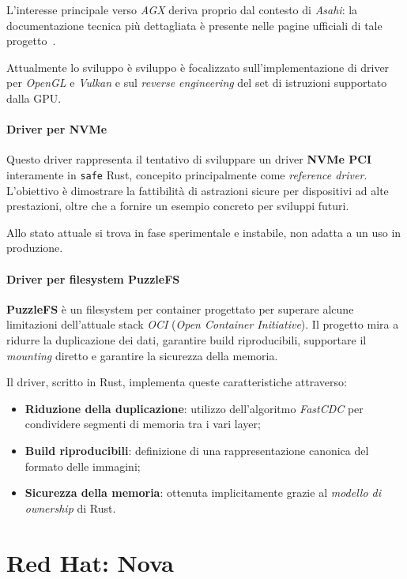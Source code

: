 L'interesse principale verso \textit{AGX} deriva proprio dal contesto di \textit{Asahi}: la documentazione tecnica più dettagliata è presente
nelle pagine ufficiali di tale progetto~\cite{asahi}.

Attualmente lo sviluppo è sviluppo è focalizzato sull'implementazione di driver per \textit{OpenGL} e \textit{Vulkan} e sul \textit{reverse engineering} del set di istruzioni 
supportato dalla GPU.\ 

\paragraph{Driver per NVMe}
Questo driver rappresenta il tentativo di sviluppare un driver \textbf{NVMe PCI} interamente in \texttt{safe} Rust, concepito principalmente come \textit{reference driver}.
L'obiettivo è dimostrare la fattibilità di astrazioni sicure per dispositivi ad alte prestazioni, oltre che a fornire un esempio concreto per sviluppi futuri.

Allo stato attuale si trova in fase sperimentale e instabile, non adatta a un uso in produzione.

\paragraph{Driver per filesystem PuzzleFS}
\textbf{PuzzleFS} è un filesystem per container progettato per superare alcune limitazioni dell'attuale stack \textit{OCI} (\textit{Open Container Initiative}).
Il progetto mira a ridurre la duplicazione dei dati, garantire build riproducibili, supportare il \textit{mounting} diretto e garantire la sicurezza della memoria.

Il driver, scritto in Rust, implementa queste caratteristiche attraverso:
\begin{itemize}
    \item \textbf{Riduzione della duplicazione}: utilizzo dell'algoritmo \textit{FastCDC} per condividere segmenti di memoria tra i vari layer;
    \item \textbf{Build riproducibili}: definizione di una rappresentazione canonica del formato delle immagini;
    \item \textbf{Sicurezza della memoria}: ottenuta implicitamente grazie al \textit{modello di ownership} di Rust.
\end{itemize}

\section{Red Hat: Nova}\label{sec:redhat-nova}

